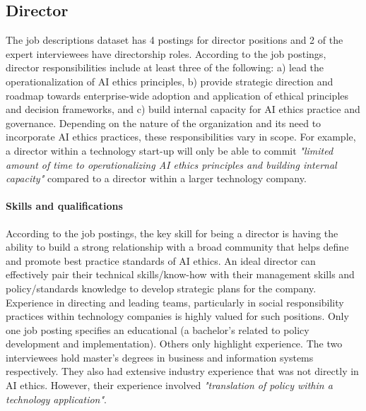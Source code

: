 \documentclass[sigconf]{acmart}
\begin{document}
\subsection{Director}

The job descriptions dataset has 4 postings for director positions and 2 of the expert interviewees have directorship roles. According to the job postings, director responsibilities include at least three of the following: a) lead the operationalization of \ac{AI} ethics principles, b) provide strategic direction and roadmap towards enterprise-wide adoption and application of ethical principles and decision frameworks, and c) build internal capacity for \ac{AI} ethics practice and governance. Depending on the nature of the organization and its need to incorporate \ac{AI} ethics practices, these responsibilities vary in scope. For example, a director within a technology start-up will only be able to commit \textit{"limited amount of time to operationalizing \ac{AI} ethics principles and building internal capacity"} compared to a director within a larger technology company. 

\paragraph{Skills and qualifications} 
According to the job postings, the key skill for being a director is having the ability to build a strong relationship with a broad community that helps define and promote best practice standards of \ac{AI} ethics. An ideal director can effectively pair their technical skills/know-how with their management skills and policy/standards knowledge to develop strategic plans for the company. Experience in directing and leading teams, particularly in social responsibility practices within technology companies is highly valued for such positions. Only one job posting specifies an educational (a bachelor's related to policy development and implementation). Others only highlight experience. The two interviewees hold master's degrees in business and information systems respectively. They also had extensive industry experience that was not directly in \ac{AI} ethics. However, their experience involved \textit{"translation of policy within a technology application"}. 
\end{document}
